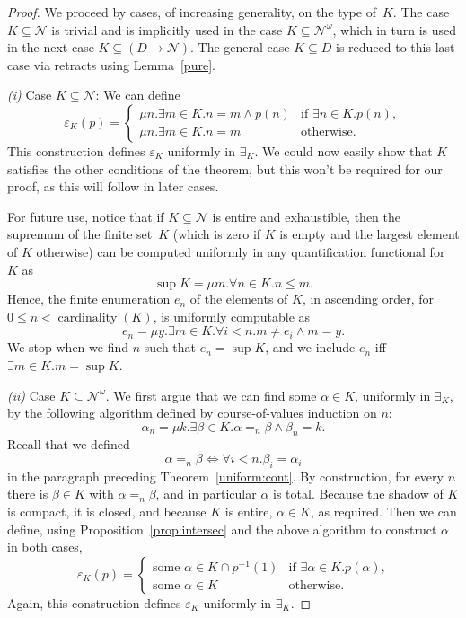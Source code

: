 \documentclass{LMCS}
\newcommand{\e}{\varepsilon}
\newcommand{\myomega}{\omega}
\newcommand{\pN}{\mathcal{N}}
\newcommand{\True}{1}\newcommand{\False}{0}\newcommand{\domain}[1]{{\D_{#1}}}
\newcommand{\D}{D}
\begin{document}
\pagebreak[3] 
\begin{proof}
  We proceed by cases, of increasing generality, on the type of~$K$.
  The case $K \subseteq \pN$ is trivial and is implicitly used in the
  case $K \subseteq \pN^\myomega$, which in turn is used in the next
  case $K \subseteq (D \to \pN)$. The general case $K \subseteq D$ is
  reduced to this last case via retracts using Lemma~\ref{pure}.

\medskip

\emph{(i)} Case $K \subseteq \pN$: We can define
\[
\e_K(p) = 
\begin{cases}
  \mu n.\exists m \in K. n = m \wedge p(n) & \text{if $\exists n \in K.p(n),$} \\
  \mu n.\exists m \in K. n = m & \text{otherwise.}
\end{cases}
\]
This construction defines $\e_K$ uniformly in
$\exists_K$. We could now easily show that $K$ satisfies the other
conditions of the theorem, but this won't be required for our proof,
as this will follow in later cases.

\medskip

For future use, notice that if $K \subseteq \pN$ is entire and
exhaustible, then the supremum of the finite set~$K$ (which is zero
if $K$ is empty and the largest element of $K$ otherwise) can be
computed uniformly in any quantification functional for~$K$ as
\[
\sup K  = \mu m. \forall n \in K. n \le m.  
\] 
Hence, the finite enumeration $e_n$ of
the elements of $K$, in ascending order, 
for $0 \le n < \operatorname{cardinality}(K)$, is
uniformly computable as
\[
e_n = \mu y.\exists m \in K. \forall i<n. m \ne e_i \wedge m = y. 
\]
We stop when we find $n$ such that $e_n = \sup K$, and we include
$e_n$ iff $\exists m \in K. m = \sup K$.

\medskip

\emph{(ii)}  Case $K \subseteq \pN^\myomega$.
We first argue that we can find some $\alpha \in K$, uniformly in
$\exists_K$, by the following algorithm defined by course-of-values
induction on $n$:
\[
\alpha_n = \mu k.\exists \beta \in K.  \alpha =_n \beta \wedge \beta_n = k.
\]
Recall that we defined 
\[
\alpha =_n \beta \iff \forall 
i<n.\beta_i = \alpha_i
\]
in the paragraph preceding Theorem~\ref{uniform:cont}.  By
construction, for every $n$ there is $\beta \in K$ with $\alpha =_n
\beta$, and in particular $\alpha$ is total.  Because the shadow of
$K$ is compact, it is closed, and because $K$ is entire, $\alpha \in
K$, as required.  Then we can define, using
Proposition~\ref{prop:intersec} and the above algorithm to construct
$\alpha$ in both cases,
\[
\e_K(p) =
\begin{cases}
  \text{some $\alpha \in K \cap p^{-1}(\True)$} & \text{if $\exists \alpha \in K.p(\alpha)$,}\\
  \text{some $\alpha \in K$} & \text{otherwise.}
\end{cases}
\]
Again,
this construction defines $\e_K$ uniformly in $\exists_K$.


\end{proof}
\end{document}
